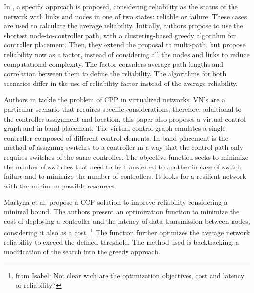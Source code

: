 \documentclass{IEEEtran}
\newcommand\fia[1]{{\color{red}\footnote{\color{red}from Isabel: #1}}} %
\begin{document}
In \cite{LiJia16}, a specific approach is proposed, considering reliability as the status of the network with links and nodes in one of two states: reliable or failure. These cases are used to calculate the average reliability. Initially, authors propose to use the shortest node-to-controller path, with a clustering-based greedy algorithm for controller placement. Then, they extend the proposal to multi-path, but propose reliability now as a factor, instead of considering all the nodes and links to reduce computational complexity. The factor considers average path lengths and correlation between them to define the reliability. The algorithms for both scenarios differ in the use of reliability factor instead of the average reliability.

Authors in \cite{VaPo17} tackle the problem of CPP in virtualized networks. VN's are a particular scenario that requires specific considerations; therefore, additional to the controller assignment and location, this paper also proposes a virtual control graph and in-band placement. The virtual control graph emulates a single controller composed of different control elements. In-band placement is the method of assigning switches to a controller in a way that the control path only requires switches of the same controller. The objective function seeks to minimize the number of switches that need to be transferred to another in case of switch failure and to minimize the number of controllers. It looks for a resilient network with the minimum possible resources. 

Martyna et al.\cite{MaJe18} propose a CCP solution to improve reliability considering a minimal bound. The authors present an optimization function to minimize the cost of deploying a controller and the latency of data transmission between nodes, considering it also as a cost. \fia{Not clear wich are the optimization objectives, cost and latency or reliability?} The function further optimizes the average network reliability to exceed the defined threshold. The method used is backtracking: a modification of the search into the greedy approach. %
\end{document}
